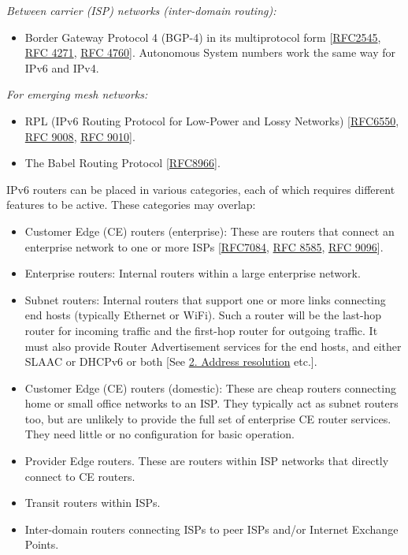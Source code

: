 \documentclass[
]{article}
\providecommand{\tightlist}{%
  \setlength{\itemsep}{0pt}\setlength{\parskip}{0pt}}
\begin{document}
\emph{Between carrier (ISP) networks (inter-domain routing):}

\begin{itemize}
\tightlist
\item
  Border Gateway Protocol 4 (BGP-4) in its multiprotocol form
  {[}\href{https://www.rfc-editor.org/info/rfc2545}{RFC2545},
  \href{https://www.rfc-editor.org/info/rfc4271}{RFC 4271},
  \href{https://www.rfc-editor.org/info/rfc4760}{RFC 4760}{]}.
  Autonomous System numbers work the same way for IPv6 and IPv4.
\end{itemize}

\emph{For emerging mesh networks:}

\begin{itemize}
\item
  RPL (IPv6 Routing Protocol for Low-Power and Lossy Networks)
  {[}\href{https://www.rfc-editor.org/info/rfc6550}{RFC6550},
  \href{https://www.rfc-editor.org/info/rfc9008}{RFC 9008},
  \href{https://www.rfc-editor.org/info/rfc9010}{RFC 9010}{]}.
\item
  The Babel Routing Protocol
  {[}\href{https://www.rfc-editor.org/info/rfc8966}{RFC8966}{]}.
\end{itemize}

IPv6 routers can be placed in various categories, each of which requires
different features to be active. These categories may overlap:

\begin{itemize}
\item
  Customer Edge (CE) routers (enterprise): These are routers that
  connect an enterprise network to one or more ISPs
  {[}\href{https://www.rfc-editor.org/info/rfc7084}{RFC7084},
  \href{https://www.rfc-editor.org/info/rfc8585}{RFC 8585},
  \href{https://www.rfc-editor.org/info/rfc9096}{RFC 9096}{]}.
\item
  Enterprise routers: Internal routers within a large enterprise
  network.
\item
  Subnet routers: Internal routers that support one or more links
  connecting end hosts (typically Ethernet or WiFi). Such a router will
  be the last-hop router for incoming traffic and the first-hop router
  for outgoing traffic. It must also provide Router Advertisement
  services for the end hosts, and either SLAAC or DHCPv6 or both {[}See
  \hyperref[address-resolution]{2. Address resolution} etc.{]}.
\item
  Customer Edge (CE) routers (domestic): These are cheap routers
  connecting home or small office networks to an ISP. They typically act
  as subnet routers too, but are unlikely to provide the full set of
  enterprise CE router services. They need little or no configuration
  for basic operation.
\item
  Provider Edge routers. These are routers within ISP networks that
  directly connect to CE routers.
\item
  Transit routers within ISPs.
\item
  Inter-domain routers connecting ISPs to peer ISPs and/or Internet
  Exchange Points.
\end{itemize}
\end{document}
